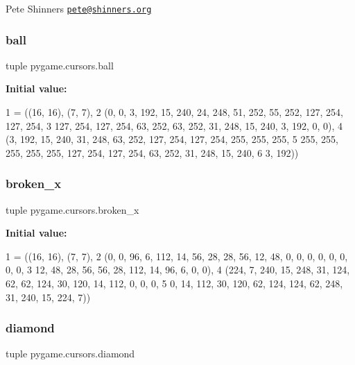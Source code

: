 Pete Shinners \href{mailto:pete@shinners.org}{\tt pete@shinners.\+org} \mbox{\label{namespacepygame_1_1cursors_af65f9378a20934bb0164ba76d0acaa7e}} 
\subsubsection{\texorpdfstring{ball}{ball}}
{\footnotesize\ttfamily tuple pygame.\+cursors.\+ball}

{\bfseries Initial value\+:}
\begin{DoxyCode}
1 =  ((16, 16), (7, 7),
2     (0, 0, 3, 192, 15, 240, 24, 248, 51, 252, 55, 252, 127, 254, 127, 254,
3      127, 254, 127, 254, 63, 252, 63, 252, 31, 248, 15, 240, 3, 192, 0, 0),
4     (3, 192, 15, 240, 31, 248, 63, 252, 127, 254, 127, 254, 255, 255, 255,
5      255, 255, 255, 255, 255, 127, 254, 127, 254, 63, 252, 31, 248, 15, 240,
6      3, 192))
\end{DoxyCode}
\mbox{\label{namespacepygame_1_1cursors_a85c7b15bfadda6d7d8c6df861376f4b7}} 
\subsubsection{\texorpdfstring{broken\+\_\+x}{broken\_x}}
{\footnotesize\ttfamily tuple pygame.\+cursors.\+broken\+\_\+x}

{\bfseries Initial value\+:}
\begin{DoxyCode}
1 =  ((16, 16), (7, 7),
2     (0, 0, 96, 6, 112, 14, 56, 28, 28, 56, 12, 48, 0, 0, 0, 0, 0, 0, 0, 0,
3      12, 48, 28, 56, 56, 28, 112, 14, 96, 6, 0, 0),
4     (224, 7, 240, 15, 248, 31, 124, 62, 62, 124, 30, 120, 14, 112, 0, 0, 0,
5      0, 14, 112, 30, 120, 62, 124, 124, 62, 248, 31, 240, 15, 224, 7))
\end{DoxyCode}
\mbox{\label{namespacepygame_1_1cursors_a548edbe0912474b543f62821a6f93466}} 
\subsubsection{\texorpdfstring{diamond}{diamond}}
{\footnotesize\ttfamily tuple pygame.\+cursors.\+diamond}

